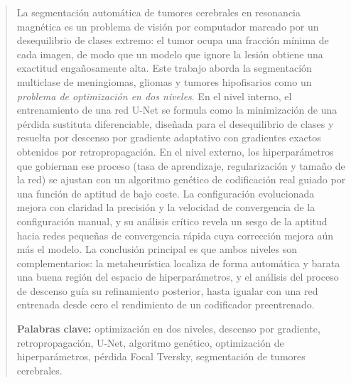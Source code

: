 \begin{abstract}
\noindent
La segmentación automática de tumores cerebrales en resonancia magnética es un problema de visión por computador marcado por un desequilibrio de clases extremo: el tumor ocupa una fracción mínima de cada imagen, de modo que un modelo que ignore la lesión obtiene una exactitud engañosamente alta. Este trabajo aborda la segmentación multiclase de meningiomas, gliomas y tumores hipofisarios como un \emph{problema de optimización en dos niveles}. En el nivel interno, el entrenamiento de una red U-Net se formula como la minimización de una pérdida sustituta diferenciable, diseñada para el desequilibrio de clases y resuelta por descenso por gradiente adaptativo con gradientes exactos obtenidos por retropropagación. En el nivel externo, los hiperparámetros que gobiernan ese proceso (tasa de aprendizaje, regularización y tamaño de la red) se ajustan con un algoritmo genético de codificación real guiado por una función de aptitud de bajo coste. La configuración evolucionada mejora con claridad la precisión y la velocidad de convergencia de la configuración manual, y su análisis crítico revela un sesgo de la aptitud hacia redes pequeñas de convergencia rápida cuya corrección mejora aún más el modelo. La conclusión principal es que ambos niveles son complementarios: la metaheurística localiza de forma automática y barata una buena región del espacio de hiperparámetros, y el análisis del proceso de descenso guía su refinamiento posterior, hasta igualar con una red entrenada desde cero el rendimiento de un codificador preentrenado.

\medskip
\noindent\textbf{Palabras clave:} optimización en dos niveles, descenso por gradiente, retropropagación, U-Net, algoritmo genético, optimización de hiperparámetros, pérdida Focal Tversky, segmentación de tumores cerebrales.
\end{abstract}
